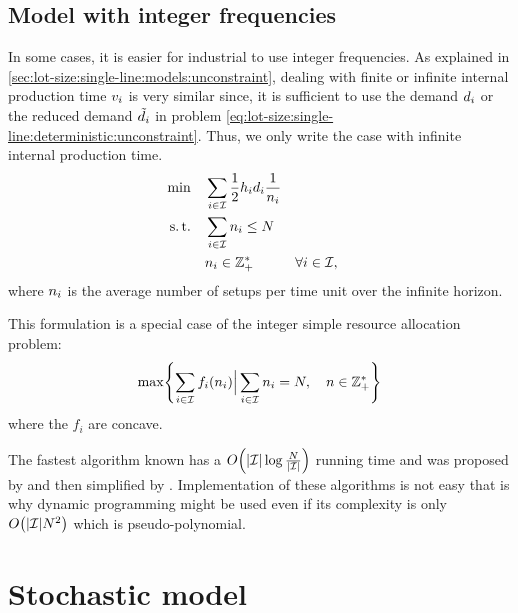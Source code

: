 


\subsection{Model with integer frequencies}


In some cases, it is easier for industrial to use integer frequencies.
As explained in \cref{sec:lot-size:single-line:models:unconstraint}, dealing with finite or infinite internal production time $v_i$ is very similar since, it is sufficient to use the demand $d_i$ or the reduced demand $\tilde{d}_i$ in problem \eqref{eq:lot-size:single-line:deterministic:unconstraint}.
Thus, we only write the case with infinite internal production time.
\begin{subequations}\label{eq:lot-size:single-line:deterministic:integer}
  \begin{align}
  \min\quad & \displaystyle\sum_{i\in\mathcal{I}} \frac{1}{2}h_id_i\frac{1}{n_i}
  \label{eq:lot-size:single-line:deterministic:integer:objective}
  \\
  \operatorname{s.t.}\quad  & \displaystyle\sum_{i\in\mathcal{I}} n_i \le N
  \label{eq:lot-size:single-line:deterministic:integer:flexibility}
  \\
       & n_i \in \mathbb{Z}_+^* && \forall i\in\mathcal{I},
  \label{eq:lot-size:single-line:deterministic:integer:positivity}
  \end{align}
\end{subequations}
where $n_i$ is the average number of setups per time unit over the infinite horizon.


This formulation is a special case of the integer simple resource allocation problem:
\begin{equation}
  \max\crbracket{\sum_{i\in\REF} f_i\bracket{\freq_i} \Big| \sum_{i\in\REF}\freq_i=\nbsetups,\quad\freq\in \ZZ_+^*}
\end{equation}
where the $f_i$ are concave.

The fastest algorithm known has a $O\bracket{\card{\REF}\log{\frac{\nbsetups}{\card{\REF}}}}$ running time and was proposed by \cite{Frederickson1982} and then simplified by \cite{Hochbaum1994}. Implementation of these algorithms is not easy that is why dynamic programming might be used even if its complexity is only $O\bracket{\card{\REF}\nbsetups^2}$ which is pseudo-polynomial.



\section{Stochastic model}


